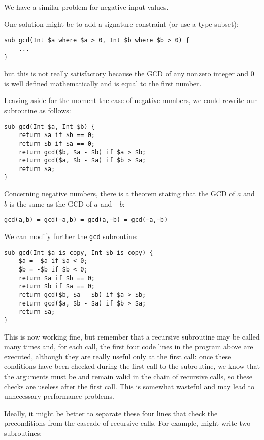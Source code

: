 We have a similar problem for negative input values.

One solution might be to add a signature constraint (or 
use a type subset):
\begin{verbatim}
sub gcd(Int $a where $a > 0, Int $b where $b > 0) {
    ...
}
\end{verbatim}
%

but this is not really satisfactory because the GCD of any 
nonzero integer and 0 is well defined mathematically and 
is equal to the first number.

Leaving aside for the moment the case of negative numbers, 
we could rewrite our subroutine as follows:

\begin{verbatim}
sub gcd(Int $a, Int $b) { 
    return $a if $b == 0;
    return $b if $a == 0;
    return gcd($b, $a - $b) if $a > $b;
    return gcd($a, $b - $a) if $b > $a;
    return $a;
}
\end{verbatim}
%

Concerning negative numbers, there is a theorem stating that 
the GCD of $a$ and $b$ is the same as the GCD of $a$ and $-b$:

\begin{center}
{\tt gcd(a,b) = gcd(−a,b) = gcd(a,−b) = gcd(−a,−b)}
\end{center}
%

We can modify further the {\tt gcd} subroutine:

\begin{verbatim}
sub gcd(Int $a is copy, Int $b is copy) { 
    $a = -$a if $a < 0;
    $b = -$b if $b < 0;
    return $a if $b == 0;
    return $b if $a == 0;
    return gcd($b, $a - $b) if $a > $b;
    return gcd($a, $b - $a) if $b > $a;
    return $a;
}
\end{verbatim}
%

This is now working fine, but remember that a recursive 
subroutine may be called many times and, for each call,
the first four code lines in the program above are 
executed, although they are really useful only at the 
first call: once these conditions have been checked during 
the first call to the subroutine, we know that the 
arguments must be and remain valid in the chain of recursive 
calls, so these checks are useless after the first call.
This is somewhat wasteful and may lead to unnecessary performance problems.

Ideally, it might be better to separate these four lines 
that check the preconditions from the cascade of recursive 
calls. For example, might write two subroutines:

